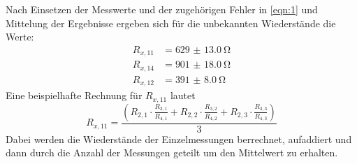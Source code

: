 \noindent Nach Einsetzen der Messwerte und der zugehörigen Fehler in
\autoref{eqn:1} und Mittelung der Ergebnisse ergeben sich für die unbekannten
Wiederstände die Werte:
\begin{align*}
       R_{x,11} &= \qty{629(13.0)}{\ohm}\\
       R_{x,14} &= \qty{901(18.0)}{\ohm}\\
       R_{x,12} &= \qty{391(8.0)}{\ohm}
\end{align*}
Eine beispielhafte Rechnung für $R_{x,11}$ lautet
\begin{equation}
       R_{x,11}= \frac{\left(R_{2,1} \cdot \frac{R_{3,1}}{R_{4,1}}+R_{2,2} \cdot \frac{R_{3,2}}{R_{4,2}}+R_{2,3} \cdot \frac{R_{3,3}}{R_{4,3}}\right)}{3}
\end{equation}
Dabei werden die Wiederstände der Einzelmessungen berrechnet, aufaddiert und dann durch die Anzahl der Messungen geteilt um den Mittelwert zu erhalten.


